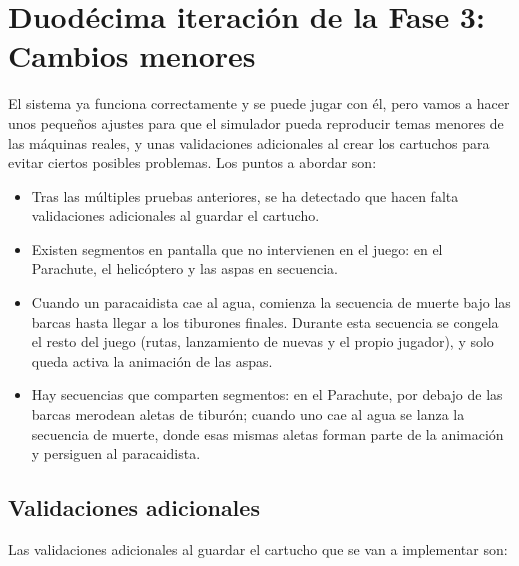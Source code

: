 \section{Duodécima iteración de la Fase 3: Cambios menores}
\label{sec:CambiosMenores}

El sistema ya funciona correctamente y se puede jugar con él, pero vamos a hacer unos pequeños ajustes para que el simulador pueda reproducir temas menores de las máquinas reales, y unas validaciones adicionales al crear los cartuchos para evitar ciertos posibles problemas. Los puntos a abordar son:

\begin{itemize}
	\item Tras las múltiples pruebas anteriores, se ha detectado que hacen falta validaciones adicionales al guardar el cartucho.
	
	\item Existen segmentos en pantalla que no intervienen en el juego: en el Parachute, el helicóptero y las aspas en secuencia.
	
	\item Cuando un paracaidista cae al agua, comienza la secuencia de muerte bajo las barcas hasta llegar a los tiburones finales. Durante esta secuencia se congela el resto del juego (rutas, lanzamiento de nuevas y el propio jugador), y solo queda activa la animación de las aspas.
	
	\item Hay secuencias que comparten segmentos: en el Parachute, por debajo de las barcas merodean aletas de tiburón; cuando uno cae al agua se lanza la secuencia de muerte, donde esas mismas aletas forman parte de la animación y persiguen al paracaidista.
\end{itemize}

\subsection{Validaciones adicionales}

Las validaciones adicionales al guardar el cartucho que se van a implementar son:

